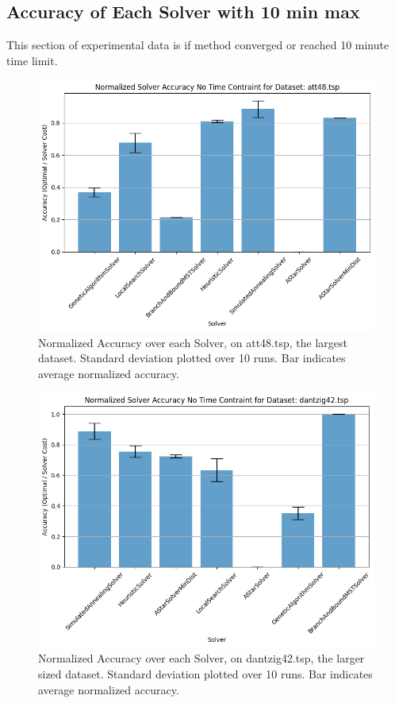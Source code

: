 \documentclass[11pt]{article}
\begin{document}
	\subsection{Accuracy of Each Solver with 10 min max}
	This section of experimental data is if method converged or reached 10 minute time limit.
	\begin{figure}[H]
		\centering
		\includegraphics[width=0.7\linewidth]{figures/accuracy_bar_time0_att48.tsp}
		\caption{Normalized Accuracy over each Solver, on att48.tsp, the largest dataset. Standard deviation plotted over 10 runs. Bar indicates average normalized accuracy.}
		\label{fig:accuracybartime0att48}
	\end{figure}
	\begin{figure}[H]
		\centering
		\includegraphics[width=0.7\linewidth]{figures/accuracy_bar_time0_dantzig42.tsp}
		\caption{Normalized Accuracy over each Solver, on dantzig42.tsp, the larger sized dataset. Standard deviation plotted over 10 runs. Bar indicates average normalized accuracy.}
		\label{fig:accuracybartime0dantzig42}
	\end{figure}
\end{document}
